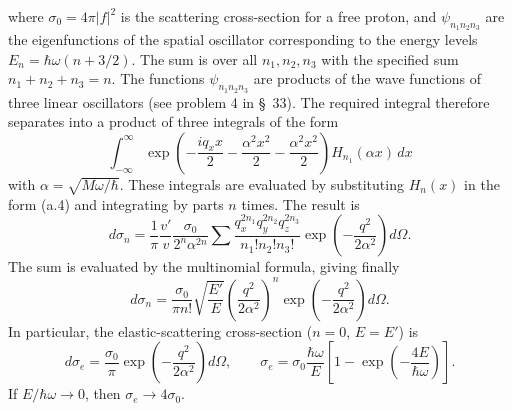 where $\sigma_0=4\pi|f|^2$ is the scattering cross-section for a free proton, and $\psi_{n_1n_2n_3}$ are the eigenfunctions of the spatial oscillator corresponding to the energy levels $E_n=\hbar\omega(n+3/2)$. The sum is over all $n_1,n_2,n_3$ with the specified sum $n_1+n_2+n_3=n$. The functions $\psi_{n_1n_2n_3}$ are products of the wave functions of three linear oscillators (see problem 4 in \S~33). The required integral therefore separates into a product of three integrals of the form
\[
 \int_{-\infty}^{\infty}\exp\left(-\frac{iq_xx}{2}-\frac{\alpha^2x^2}{2}-\frac{\alpha^2x^2}{2}\right)H_{n_1}(\alpha x)\,dx
\]
with $\alpha=\sqrt{M\omega/\hbar}$. These integrals are evaluated by substituting $H_n(x)$ in the form (a.4) and integrating by parts $n$ times. The result is
\[
 d\sigma_n=\frac1\pi\frac{v'}v\frac{\sigma_0}{2^n\alpha^{2n}}
 \sum\frac{q_x^{2n_1}q_y^{2n_2}q_z^{2n_3}}{n_1!n_2!n_3!}
 \exp\left(-\frac{q^2}{2\alpha^2}\right)d\Omega.
\]
The sum is evaluated by the multinomial formula, giving finally
\[
 d\sigma_n=\frac{\sigma_0}{\pi n!}\sqrt{\frac{E'}E}
 \left(\frac{q^2}{2\alpha^2}\right)^n
 \exp\left(-\frac{q^2}{2\alpha^2}\right)d\Omega.
\]
In particular, the elastic-scattering cross-section ($n=0$, $E=E'$) is
\[
 d\sigma_e=\frac{\sigma_0}{\pi}\exp\left(-\frac{q^2}{2\alpha^2}\right)d\Omega,
 \qquad
 \sigma_e=\sigma_0\frac{\hbar\omega}{E}
 \left[1-\exp\left(-\frac{4E}{\hbar\omega}\right)\right].
\]
If $E/\hbar\omega\longrightarrow0$, then $\sigma_e\longrightarrow4\sigma_0$.
